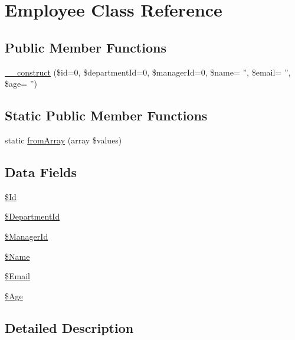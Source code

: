 \hypertarget{class_employee}{\section{\-Employee \-Class \-Reference}
\label{class_employee}
}
\subsection*{\-Public \-Member \-Functions}
\begin{DoxyCompactItemize}
\item 
\hyperlink{class_employee_a3e6e0b587a4504ccb02e135c1e3364ff}{\-\_\-\-\_\-construct} (\$id=0, \$department\-Id=0, \$manager\-Id=0, \$name= '', \$email= '', \$age= '')
\end{DoxyCompactItemize}
\subsection*{\-Static \-Public \-Member \-Functions}
\begin{DoxyCompactItemize}
\item 
static \hyperlink{class_employee_aa166d789f1e7fa5529a91cfe0b149db7}{from\-Array} (array \$values)
\end{DoxyCompactItemize}
\subsection*{\-Data \-Fields}
\begin{DoxyCompactItemize}
\item 
\hyperlink{class_employee_ae24f09f6f3375b938ae2625f53cea439}{\$\-Id}
\item 
\hyperlink{class_employee_a2dd64d3f7291bbf8d6c4e10041eb40d8}{\$\-Department\-Id}
\item 
\hyperlink{class_employee_a2185e0bdd33afb8b99dd58561f557f0c}{\$\-Manager\-Id}
\item 
\hyperlink{class_employee_a90efb261c13e9a3e16ed2b0563dec08d}{\$\-Name}
\item 
\hyperlink{class_employee_a46da2886d0fe6510e2e0cd92aae2e79d}{\$\-Email}
\item 
\hyperlink{class_employee_a43e87291035e413ef09648f55c8351ee}{\$\-Age}
\end{DoxyCompactItemize}


\subsection{\-Detailed \-Description}


